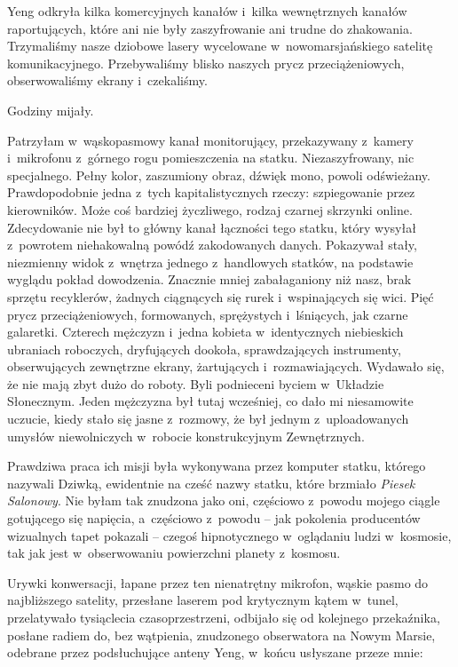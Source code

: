 \documentclass[oneside,polish,11pt,sfheadings]{mwbk}
\begin{document}
Yeng odkryła kilka komercyjnych kanałów i~kilka wewnętrznych kanałów
raportujących, które ani nie były zaszyfrowanie ani trudne do
zhakowania. Trzymaliśmy nasze dziobowe lasery wycelowane w~nowomarsjańskiego satelitę komunikacyjnego. Przebywaliśmy blisko naszych
prycz przeciążeniowych, obserwowaliśmy ekrany i~czekaliśmy.

Godziny mijały.

Patrzyłam w~wąskopasmowy kanał monitorujący, przekazywany z~kamery i~mikrofonu z~górnego rogu pomieszczenia na statku. Niezaszyfrowany, nic
specjalnego. Pełny kolor, zaszumiony obraz, dźwięk mono, powoli
odświeżany. Prawdopodobnie jedna z~tych kapitalistycznych rzeczy:
szpiegowanie przez kierowników. Może coś bardziej życzliwego, rodzaj
czarnej skrzynki online. Zdecydowanie nie był to główny kanał łączności
tego statku, który wysyłał z~powrotem niehakowalną powódź zakodowanych
danych. Pokazywał stały, niezmienny widok z~wnętrza jednego z~handlowych
statków, na podstawie wyglądu pokład dowodzenia. Znacznie mniej
zabałaganiony niż nasz, brak sprzętu recyklerów, żadnych ciągnących się
rurek i~wspinających się wici. Pięć prycz przeciążeniowych, formowanych,
sprężystych i~lśniących, jak czarne galaretki. Czterech mężczyzn i~jedna
kobieta w~identycznych niebieskich ubraniach roboczych, dryfujących
dookoła, sprawdzających instrumenty, obserwujących zewnętrzne ekrany,
żartujących i~rozmawiających. Wydawało się, że nie mają zbyt dużo do
roboty. Byli podnieceni byciem w~Układzie Słonecznym. Jeden mężczyzna
był tutaj wcześniej, co dało mi niesamowite uczucie, kiedy stało się
jasne z~rozmowy, że był jednym z~uploadowanych umysłów niewolniczych w~robocie konstrukcyjnym Zewnętrznych.

Prawdziwa praca ich misji była wykonywana przez komputer statku, którego
nazywali Dziwką, ewidentnie na cześć nazwy statku, które brzmiało
\textit{Piesek Salonowy}. Nie byłam tak znudzona jako oni, częściowo z~powodu mojego ciągle gotującego się napięcia, a~częściowo z~powodu -- jak
pokolenia producentów wizualnych tapet pokazali -- czegoś hipnotycznego w~oglądaniu ludzi w~kosmosie, tak jak jest w~obserwowaniu powierzchni
planety z~kosmosu.

Urywki konwersacji, łapane przez ten nienatrętny mikrofon, wąskie pasmo
do najbliższego satelity, przesłane laserem pod krytycznym kątem w~tunel, przelatywało tysiąclecia czasoprzestrzeni, odbijało się od
kolejnego przekaźnika, posłane radiem do, bez wątpienia, znudzonego
obserwatora na Nowym Marsie, odebrane przez podsłuchujące anteny Yeng, w~końcu usłyszane przeze mnie:
\end{document}

